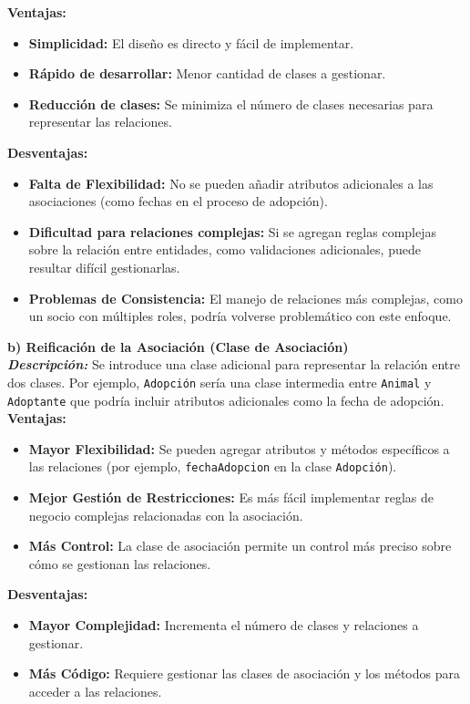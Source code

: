 \textbf{Ventajas:}
\begin{itemize}
    \item \textbf{Simplicidad:} El diseño es directo y fácil de implementar.
    \item \textbf{Rápido de desarrollar:} Menor cantidad de clases a gestionar.
    \item \textbf{Reducción de clases:} Se minimiza el número de clases necesarias para representar las relaciones.
\end{itemize}

\textbf{Desventajas:}
\begin{itemize}
    \item \textbf{Falta de Flexibilidad:} No se pueden añadir atributos adicionales a las asociaciones (como fechas en el proceso de adopción).
    \item \textbf{Dificultad para relaciones complejas:} Si se agregan reglas complejas sobre la relación entre entidades, como validaciones adicionales, puede resultar difícil gestionarlas.
    \item \textbf{Problemas de Consistencia:} El manejo de relaciones más complejas, como un socio con múltiples roles, podría volverse problemático con este enfoque.
\end{itemize}

\textbf{b) Reificación de la Asociación (Clase de Asociación)}\\

\textit{\textbf{Descripción:}  }
Se introduce una clase adicional para representar la relación entre dos clases. Por ejemplo, \texttt{Adopción} sería una clase intermedia entre \texttt{Animal} y \texttt{Adoptante} que podría incluir atributos adicionales como la fecha de adopción.\\

\textbf{Ventajas:}
\begin{itemize}
    \item \textbf{Mayor Flexibilidad:} Se pueden agregar atributos y métodos específicos a las relaciones (por ejemplo, \texttt{fechaAdopcion} en la clase \texttt{Adopción}).
    \item \textbf{Mejor Gestión de Restricciones:} Es más fácil implementar reglas de negocio complejas relacionadas con la asociación.
    \item \textbf{Más Control:} La clase de asociación permite un control más preciso sobre cómo se gestionan las relaciones.
\end{itemize}

\textbf{Desventajas:}
\begin{itemize}
    \item \textbf{Mayor Complejidad:} Incrementa el número de clases y relaciones a gestionar.
    \item \textbf{Más Código:} Requiere gestionar las clases de asociación y los métodos para acceder a las relaciones.
\end{itemize}

